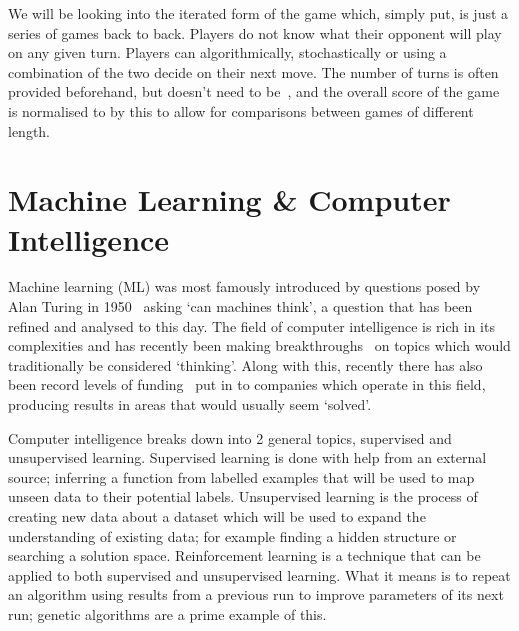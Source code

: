 We will be looking into the iterated form of the game which, simply put, is just a series of games back to back. 
Players do not know what their opponent will play on any given turn.
Players can algorithmically, stochastically or using a combination of the two decide on their next move.
The number of turns is often provided beforehand, but doesn't need to be~\cite{axelrod1980more}, and the overall score of the game is normalised to by this to allow for comparisons between games of different length.

\section{Machine Learning \& Computer Intelligence}\label{sec:machineLearningAndcomputerIntelligence}
Machine learning (ML) was most famously introduced by questions posed by Alan Turing in 1950~\cite{turing1950computing} asking `can machines think', a question that has been refined and analysed to this day.
The field of computer intelligence is rich in its complexities and has recently been making breakthroughs~\cite{knight2017alphaZeroMIT} on topics which would traditionally be considered `thinking'.
Along with this, recently there has also been record levels of funding~\cite{chui2017artificial} put in to companies which operate in this field, producing results in areas that would usually seem `solved'.

Computer intelligence breaks down into 2 general topics, supervised and unsupervised learning.
Supervised learning is done with help from an external source; inferring a function from labelled examples that will be used to map unseen data to their potential labels.
Unsupervised learning is the process of creating new data about a dataset which will be used to expand the understanding of existing data; for example finding a hidden structure or searching a solution space.
Reinforcement learning is a technique that can be applied to both supervised and unsupervised learning.
What it means is to repeat an algorithm using results from a previous run to improve parameters of its next run; genetic algorithms are a prime example of this.

